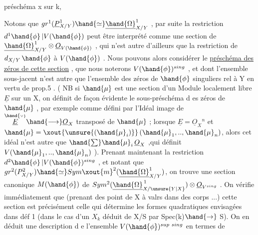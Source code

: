 
préschéma x sur k, 

Notons que $gr^1(\underline{P}^1_{X/Y}) \hand{\simeq} \underline{\hand{\Omega}}^1_{X/Y}$ , par suite la restriction
$d^1\hand{\phi}\,|V(\hand{\phi})$ peut être interprété comme une section de $\underline{\hand{\Omega}}^1_{X/Y} \otimes \underline{O}_{V(\hand{\phi})}$ ,
qui n'est autre d'ailleurs que la restriction de $d_{X/Y}\,\hand{\phi}$ à $V(\hand{\phi})$ . Nous
pouvons alors considérer le \uline{préschéma des zéros de cette section} , que
nous noterons $V(\hand{\phi})^{sing}$ , et dont l'ensemble sous-jacent n'est autre
que l'ensemble des zéros de $\hand{\phi}$ singuliers rel à Y en vertu de prop.5 .
( NB si \xout{\unsure{$\hand{\phi}$}} $\hand{\mu}$ est une section d'un Module localement libre  $\underline{E}$ sur un
\margin{$\|$}  X, on définit de façon évidente le sous-préschéma d es
zéros de $\hand{\mu}$ , par exemple comme défini par l'Idéal image de $\overset{\hand{\scriptscriptstyle\vee}}{\underline{E}} \hand{\longrightarrow} \underline{O}_X$
transposé de $\hand{\mu}$ ; lorsque $\underline{E} = \underline{O}_X{}^n$ et $\hand{\mu} = \xout{\unsure{(\hand{\mu}_i)}}\,(\hand{\mu}_1,..,\hand{\mu}_n)$, alors cet
idéal n'est autre que $\hand{\sum} \hand{\mu}_i\,\underline{O}_X$ ,qui définit $V(\hand{\mu}_1,..,\hand{\mu}_n)$ ). Prenant
maintenant la restriction $d^2\hand{\phi}\,|V(\hand{\phi})^{sing}$ , et notant que
$gr^2(P^2_{X/Y}) \hand{\simeq} Sym\xout{m}^2(\underline{\hand{\Omega}}^1_{X/Y})$, on trouve une section canonique $M(\hand{\phi})$ de
$Sym^2(\underline{\hand{\Omega}}^{\,1}_{X/\unsure{Y|X}}) \otimes \underline{O}_{V^{sing}}$ . On vérifie immédiatement que (prenant des
\margin{$\|$}point de X à valrs dans des corps ...) cette section est précisément
celle qui détermine les formes quadratiques envisagées dans déf 1
(dans le cas  d'un $X_k$ déduit de X/S par Spec(k)$\hand{\rightarrow}$ S). On
en déduit une description d e l'ensemble $V(\hand{\phi})^{sup\ sing}$ en termes de
